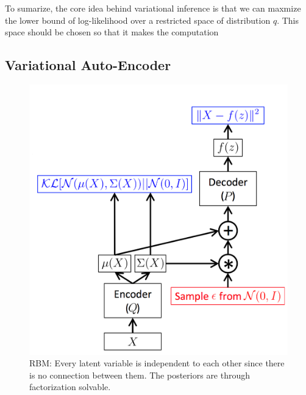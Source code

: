 \documentclass[conference]{IEEEtran}
\begin{document}
To sumarize, the core idea behind variational inference is that we can maxmize the lower bound of log-likelihood over a restricted space of distribution $q$. This space should be chosen so that it makes the computation 
\subsection{Variational Auto-Encoder}
\begin{figure}[ht]
  \centering
  \includegraphics[scale=0.4]{picture3.png}
     \caption{RBM: Every latent variable is independent to each other since there is no connection between them. The posteriors are through factorization solvable.}\label{pic_3}
\end{figure}
\end{document}
